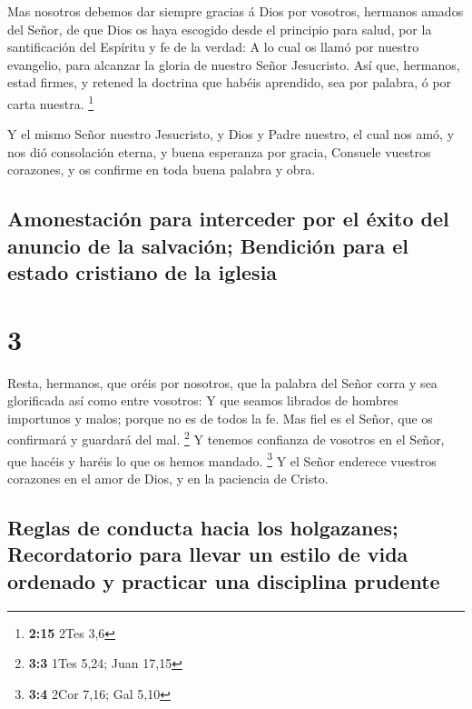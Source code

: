  Mas nosotros debemos dar siempre gracias á Dios por
vosotros, hermanos amados del Señor, de que Dios os haya escogido desde
el principio para salud, por la santificación del Espíritu y fe de la
verdad:  A lo cual os llamó por nuestro evangelio, para
alcanzar la gloria de nuestro Señor Jesucristo.  Así que,
hermanos, estad firmes, y retened la doctrina que habéis aprendido, sea
por palabra, ó por carta nuestra. \footnote{\textbf{2:15} 2Tes 3,6}

 Y el mismo Señor nuestro Jesucristo, y Dios y Padre
nuestro, el cual nos amó, y nos dió consolación eterna, y buena
esperanza por gracia,  Consuele vuestros corazones, y os
confirme en toda buena palabra y obra.

\hypertarget{amonestaciuxf3n-para-interceder-por-el-uxe9xito-del-anuncio-de-la-salvaciuxf3n-bendiciuxf3n-para-el-estado-cristiano-de-la-iglesia}{%
\subsection{Amonestación para interceder por el éxito del anuncio de la
salvación; Bendición para el estado cristiano de la
iglesia}\label{amonestaciuxf3n-para-interceder-por-el-uxe9xito-del-anuncio-de-la-salvaciuxf3n-bendiciuxf3n-para-el-estado-cristiano-de-la-iglesia}}

\hypertarget{section-2}{%
\section{3}\label{section-2}}

 Resta, hermanos, que oréis por nosotros, que la palabra del
Señor corra y sea glorificada así como entre vosotros:  Y
que seamos librados de hombres importunos y malos; porque no es de todos
la fe.  Mas fiel es el Señor, que os confirmará y guardará
del mal. \footnote{\textbf{3:3} 1Tes 5,24; Juan 17,15}  Y
tenemos confianza de vosotros en el Señor, que hacéis y haréis lo que os
hemos mandado. \footnote{\textbf{3:4} 2Cor 7,16; Gal 5,10} 
Y el Señor enderece vuestros corazones en el amor de Dios, y en la
paciencia de Cristo.

\hypertarget{reglas-de-conducta-hacia-los-holgazanes-recordatorio-para-llevar-un-estilo-de-vida-ordenado-y-practicar-una-disciplina-prudente}{%
\subsection{Reglas de conducta hacia los holgazanes; Recordatorio para
llevar un estilo de vida ordenado y practicar una disciplina
prudente}\label{reglas-de-conducta-hacia-los-holgazanes-recordatorio-para-llevar-un-estilo-de-vida-ordenado-y-practicar-una-disciplina-prudente}}

